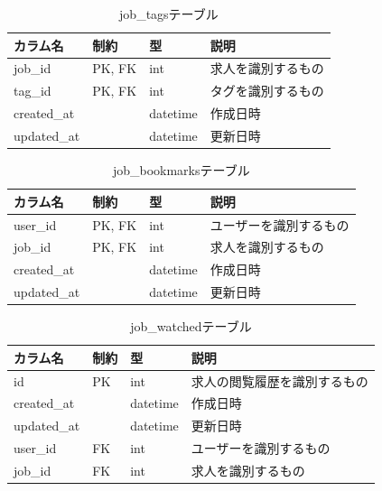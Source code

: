 \begin{table}[H]
  \centering
  \caption{job\_tagsテーブル}
  \label{tab:db-job-tags}
  \begin{tabular}{|l|l|l|l|} \hline
    カラム名        & 制約     & 型        & 説明        \\ \hline \hline
    job\_id     & PK, FK & int      & 求人を識別するもの \\ \hline
    tag\_id     & PK, FK & int      & タグを識別するもの \\ \hline
    created\_at &        & datetime & 作成日時      \\ \hline
    updated\_at &        & datetime & 更新日時      \\ \hline
  \end{tabular}
\end{table}

\begin{table}[H]
  \centering
  \caption{job\_bookmarksテーブル}
  \label{tab:db-job-bookmarks}
  \begin{tabular}{|l|l|l|l|} \hline
    カラム名        & 制約     & 型        & 説明          \\ \hline \hline
    user\_id    & PK, FK & int      & ユーザーを識別するもの \\ \hline
    job\_id     & PK, FK & int      & 求人を識別するもの   \\ \hline
    created\_at &        & datetime & 作成日時        \\ \hline
    updated\_at &        & datetime & 更新日時        \\ \hline
  \end{tabular}
\end{table}

\begin{table}[H]
  \centering
  \caption{job\_watchedテーブル}
  \label{tab:db-job-watched}
  \begin{tabular}{|l|l|l|l|} \hline
    カラム名        & 制約 & 型        & 説明             \\ \hline \hline
    id          & PK & int      & 求人の閲覧履歴を識別するもの \\ \hline
    created\_at &    & datetime & 作成日時           \\ \hline
    updated\_at &    & datetime & 更新日時           \\ \hline
    user\_id    & FK & int      & ユーザーを識別するもの    \\ \hline
    job\_id     & FK & int      & 求人を識別するもの      \\ \hline
  \end{tabular}
\end{table}


